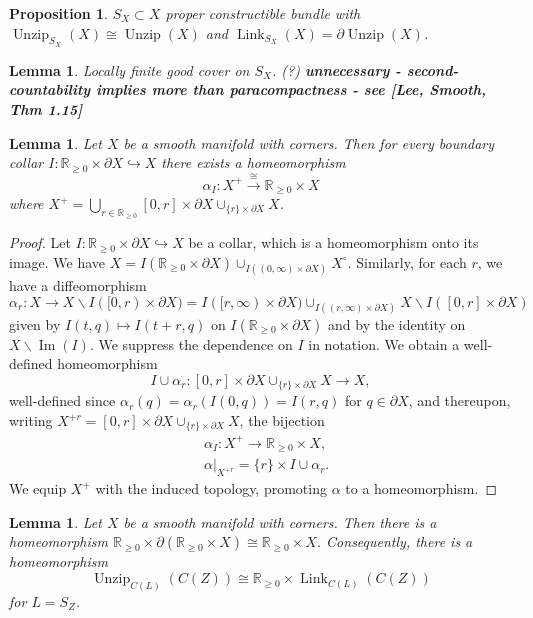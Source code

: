 \documentclass[11pt]{amsart}
\newcommand{\mbb}[1]{\mathbb{#1}}
\newcommand{\R}{\mbb{R}}
\DeclareMathOperator{\Imm}{Im}
\DeclareMathOperator{\Unzip}{Unzip}
\DeclareMathOperator{\Link}{Link}
\numberwithin{equation}{section}
\theoremstyle{definition}
\theoremstyle{remark}
\theoremstyle{plain}
\newtheorem{proposition}[equation]{Proposition}
\newtheorem{lemma}[equation]{Lemma}
\begin{document}
\begin{proposition}\label{7GBVGBA}
    $S_X\subset X$ proper constructible bundle with $\Unzip_{S_X}(X)\cong\Unzip(X)$ and $\Link_{S_X}(X)=\partial\Unzip(X)$.
\end{proposition}


\begin{lemma}\label{DNFREG0}
    {\color{gray}Locally finite good cover on $S_X$. (?)} {\bf unnecessary - second-countability implies more than paracompactness - see [Lee, Smooth, Thm 1.15]}
\end{lemma}

\begin{lemma}\label{K52SWOM}
    Let $X$ be a smooth manifold with corners. Then for every boundary collar $I\colon \R_{\geq0}\times \partial X\hookrightarrow X$ there exists a homeomorphism
    \[
        \alpha_I\colon X^+\xrightarrow{\cong}\R_{\geq0}\times X
    \]
    where $X^+=\bigcup_{r\in\R_{\geq0}}[0,r]\times\partial X\cup_{\{r\}\times\partial X}X$.
\end{lemma}
\begin{proof}
    Let $I\colon\R_{\geq0}\times\partial X\hookrightarrow X$ be a collar, which is a homeomorphism onto its image. We have $X=I(\R_{\geq0}\times \partial X)\cup_{I((0,\infty)\times\partial X)}X^\circ$. Similarly, for each $r$, we have a diffeomorphism 
    \[
        \alpha_r\colon X\to X\smallsetminus I([0,r)\times\partial X)=I([r,\infty)\times\partial X)\cup_{I((r,\infty)\times\partial X)}X\smallsetminus I([0,r]\times\partial X)
    \]
    given by $I(t,q)\mapsto I(t+r,q)$ on $I(\R_{\geq0}\times\partial X)$ and by the identity on $X\smallsetminus \Imm(I)$. We suppress the dependence on $I$ in notation. We obtain a well-defined homeomorphism 
    \[
        I\cup\alpha_r\colon [0,r]\times\partial X\cup_{\{r\}\times \partial X}X\to X,
    \]
    well-defined since $\alpha_r(q)=\alpha_r(I(0,q))=I(r,q)$ for $q\in\partial X$, and thereupon, writing $X^{+r}=[0,r]\times\partial X\cup_{\{r\}\times \partial X}X$, the bijection 
    \begin{align*}
        &\alpha_I\colon X^+\to \R_{\geq0}\times X,\\
        &\alpha|_{X^{+r}}=\{r\}\times I\cup\alpha_r.
    \end{align*}
    We equip $X^+$ with the induced topology, promoting $\alpha$ to a homeomorphism.
\end{proof}


\begin{lemma}\label{DGSR46V}
    Let $X$ be a smooth manifold with corners. Then there is a homeomorphism $\R_{\geq0}\times \partial(\R_{\geq0}\times X)\cong\R_{\geq0} \times X$. Consequently, there is a homeomorphism
    \[
        \Unzip_{C(L)}(C(Z))\cong\R_{\geq0}\times\Link_{C(L)}(C(Z))
    \] 
    for $L=S_Z$.
\end{lemma}
\end{document}
